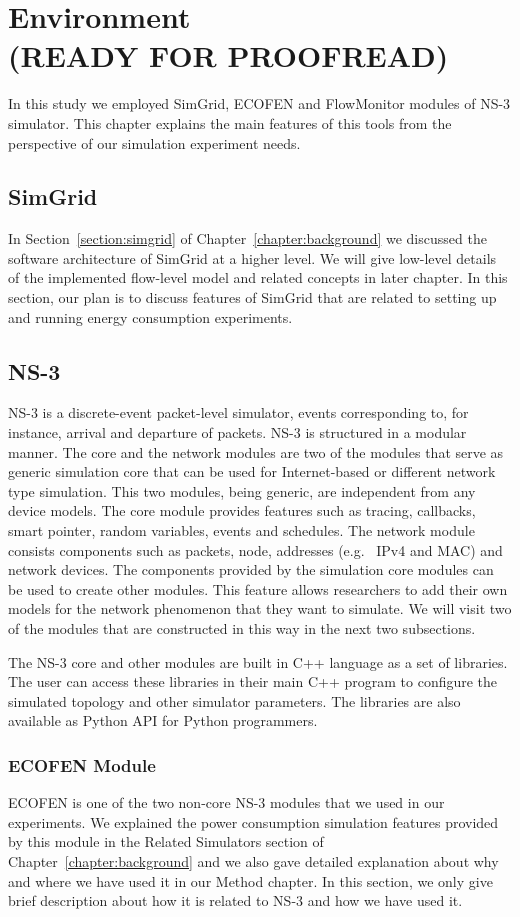 \chapter{Environment\\(READY FOR PROOFREAD)}
\label{chapter:environment}
In this study we employed SimGrid, ECOFEN and FlowMonitor modules of NS-3 simulator. This chapter explains the main features of this tools from the perspective of our simulation experiment needs.
\section{SimGrid}
In Section~\ref{section:simgrid} of Chapter~\ref{chapter:background} we discussed the software architecture of SimGrid at a higher level. We will give low-level details of the implemented flow-level model and related concepts in later chapter. In this section, our plan is to discuss features of SimGrid that are related to setting up and running energy consumption experiments.
\section{NS-3}
NS-3 is a discrete-event packet-level simulator, events corresponding to, for instance, arrival and departure of packets. NS-3 is structured in a modular manner. The core and the network modules are two of the modules that serve as generic simulation core that can be used for Internet-based or different network type simulation. This two modules, being generic, are independent from any device models. The core module provides features such as tracing, callbacks, smart pointer, random variables, events and schedules. The network module consists components such as packets, node, addresses (e.g.{\ } IPv4 and MAC) and network devices. The components provided by the simulation core modules can be used to create other modules. This feature allows researchers to add their own models for the network phenomenon that they want to simulate. We will visit two of the modules that are constructed in this way in the next two subsections\cite{ns3}. 

The NS-3 core and other modules are built in C++ language as a set of libraries. The user can access these libraries in their main C++ program to configure the simulated topology and other simulator parameters. The libraries are also available as Python API for Python programmers. 
\subsection{ECOFEN Module}
ECOFEN is one of the two non-core NS-3 modules that we used in our experiments. We explained the power consumption simulation features provided by this module in the Related Simulators section of Chapter~\ref{chapter:background} and we also gave detailed explanation about why and where we have used it in our Method chapter. In this section, we only give brief description about how it is related to NS-3 and how we have used it. 

